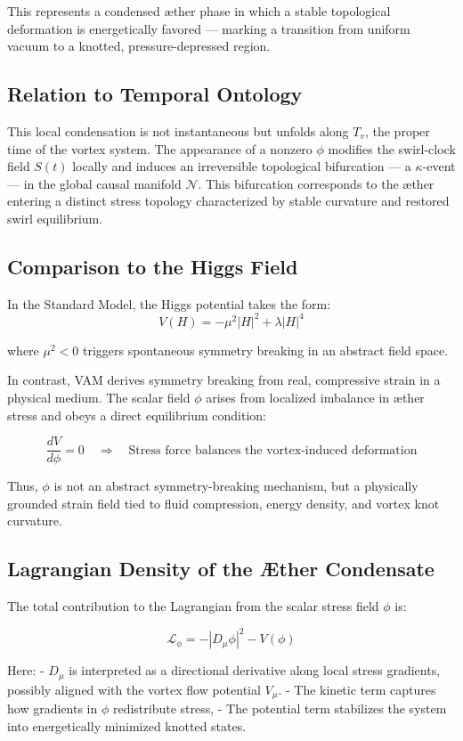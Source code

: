 This represents a condensed æther phase in which a stable topological deformation is energetically favored — marking a transition from uniform vacuum to a knotted, pressure-depressed region.

\subsection*{Relation to Temporal Ontology}

This local condensation is not instantaneous but unfolds along $T_v$, the proper time of the vortex system. The appearance of a nonzero $\phi$ modifies the swirl-clock field $S(t)$ locally and induces an irreversible topological bifurcation — a $\kappa$-event — in the global causal manifold $\mathcal{N}$. This bifurcation corresponds to the æther entering a distinct stress topology characterized by stable curvature and restored swirl equilibrium.

\subsection*{Comparison to the Higgs Field}

In the Standard Model, the Higgs potential takes the form:
\[
V(H) = -\mu^2 |H|^2 + \lambda |H|^4
\]

where $\mu^2 < 0$ triggers spontaneous symmetry breaking in an abstract field space.

In contrast, VAM derives symmetry breaking from real, compressive strain in a physical medium. The scalar field $\phi$ arises from localized imbalance in æther stress and obeys a direct equilibrium condition:

\[
\frac{dV}{d\phi} = 0 \quad \Rightarrow \quad \text{Stress force balances the vortex-induced deformation}
\]

Thus, $\phi$ is not an abstract symmetry-breaking mechanism, but a physically grounded strain field tied to fluid compression, energy density, and vortex knot curvature.

\subsection*{Lagrangian Density of the Æther Condensate}

The total contribution to the Lagrangian from the scalar stress field $\phi$ is:

\[
\mathcal{L}_\phi = -|D_\mu \phi|^2 - V(\phi)
\]

Here:
- $D_\mu$ is interpreted as a directional derivative along local stress gradients, possibly aligned with the vortex flow potential $V_\mu$.
- The kinetic term captures how gradients in $\phi$ redistribute stress,
- The potential term stabilizes the system into energetically minimized knotted states.

